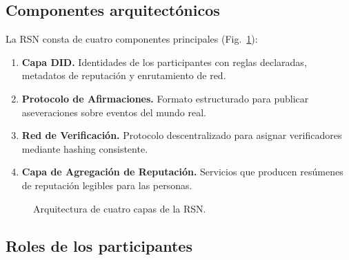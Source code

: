 \documentclass[11pt,a4paper,twocolumn]{article}
\begin{document}
\subsection{Componentes arquitectónicos}

La RSN consta de cuatro componentes principales (Fig.~\ref{fig:architecture}):
\begin{enumerate}[nosep]
\item \textbf{Capa DID.} Identidades de los participantes con reglas declaradas, metadatos de reputación y enrutamiento de red.
\item \textbf{Protocolo de Afirmaciones.} Formato estructurado para publicar aseveraciones sobre eventos del mundo real.
\item \textbf{Red de Verificación.} Protocolo descentralizado para asignar verificadores mediante hashing consistente.
\item \textbf{Capa de Agregación de Reputación.} Servicios que producen resúmenes de reputación legibles para las personas.
\end{enumerate}

\begin{figure}[ht]
\centering
{}
\caption{Arquitectura de cuatro capas de la RSN.}
\label{fig:architecture}
\end{figure}

\subsection{Roles de los participantes}
\end{document}
